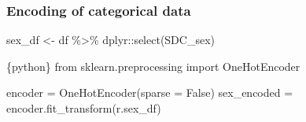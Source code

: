 \documentclass[
  letterpaper,
  DIV=11,
  numbers=noendperiod,
  oneside]{scrreprt}
\newenvironment{Shaded}{\begin{snugshade}}{\end{snugshade}}
\newcommand{\AttributeTok}[1]{\textcolor[rgb]{0.40,0.45,0.13}{#1}}
\newcommand{\DecValTok}[1]{\textcolor[rgb]{0.68,0.00,0.00}{#1}}
\newcommand{\FunctionTok}[1]{\textcolor[rgb]{0.28,0.35,0.67}{#1}}
\newcommand{\ImportTok}[1]{\textcolor[rgb]{0.00,0.46,0.62}{#1}}
\newcommand{\InformationTok}[1]{\textcolor[rgb]{0.37,0.37,0.37}{#1}}
\newcommand{\NormalTok}[1]{\textcolor[rgb]{0.00,0.23,0.31}{#1}}
\newcommand{\OperatorTok}[1]{\textcolor[rgb]{0.37,0.37,0.37}{#1}}
\newcommand{\OtherTok}[1]{\textcolor[rgb]{0.00,0.23,0.31}{#1}}
\newcommand{\SpecialCharTok}[1]{\textcolor[rgb]{0.37,0.37,0.37}{#1}}
\newcommand{\VariableTok}[1]{\textcolor[rgb]{0.07,0.07,0.07}{#1}}
\begin{document}
\hypertarget{encoding-of-categorical-data}{%
\subsubsection{Encoding of categorical
data}\label{encoding-of-categorical-data}}

\begin{Shaded}
\begin{Highlighting}[]
\NormalTok{sex\_df }\OtherTok{\textless{}{-}}\NormalTok{ df }\SpecialCharTok{\%\textgreater{}\%}
\NormalTok{  dplyr}\SpecialCharTok{::}\FunctionTok{select}\NormalTok{(SDC\_sex)}
\end{Highlighting}
\end{Shaded}

\begin{Shaded}
\begin{Highlighting}[]
\InformationTok{\textasciigrave{}\textasciigrave{}\textasciigrave{}\{python\}}
\ImportTok{from}\NormalTok{ sklearn.preprocessing }\ImportTok{import}\NormalTok{ OneHotEncoder}

\NormalTok{encoder }\OperatorTok{=}\NormalTok{ OneHotEncoder(sparse }\OperatorTok{=} \VariableTok{False}\NormalTok{)}
\NormalTok{sex\_encoded }\OperatorTok{=}\NormalTok{ encoder.fit\_transform(r.sex\_df)}
\InformationTok{\textasciigrave{}\textasciigrave{}\textasciigrave{}}
\end{Highlighting}
\end{Shaded}

\begin{Shaded}
\end{Shaded}
\end{document}
